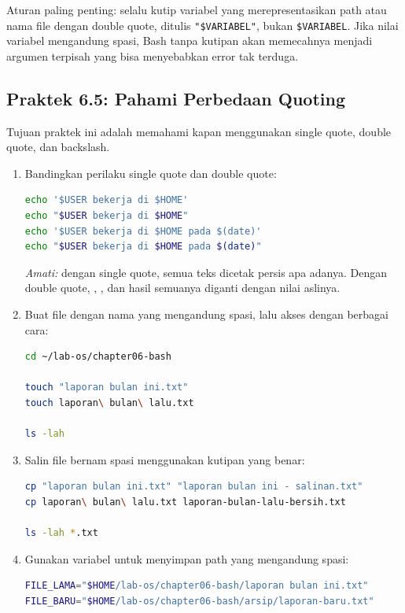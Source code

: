 Aturan paling penting: selalu kutip variabel yang merepresentasikan path
atau nama file dengan double quote, ditulis \texttt{"\$VARIABEL"}, bukan
\texttt{\$VARIABEL}. Jika nilai variabel mengandung spasi, Bash tanpa
kutipan akan memecahnya menjadi argumen terpisah yang bisa menyebabkan
error tak terduga.

\subsection*{Praktek 6.5: Pahami Perbedaan Quoting}

Tujuan praktek ini adalah memahami kapan menggunakan single quote,
double quote, dan backslash.

\begin{enumerate}
    \item Bandingkan perilaku single quote dan double quote:
\begin{lstlisting}[language=bash, caption={Perbedaan single quote dan double quote}]
echo '$USER bekerja di $HOME'
echo "$USER bekerja di $HOME"
echo '$USER bekerja di $HOME pada $(date)'
echo "$USER bekerja di $HOME pada $(date)"
\end{lstlisting}
    \textit{Amati:} dengan single quote, semua teks dicetak persis apa
    adanya. Dengan double quote, , , dan hasil
     semuanya diganti dengan nilai aslinya.

    \item Buat file dengan nama yang mengandung spasi, lalu akses dengan
          berbagai cara:
\begin{lstlisting}[language=bash, caption={Menangani nama file dengan spasi}]
cd ~/lab-os/chapter06-bash

touch "laporan bulan ini.txt"
touch laporan\ bulan\ lalu.txt

ls -lah
\end{lstlisting}

    \item Salin file bernam spasi menggunakan kutipan yang benar:
\begin{lstlisting}[language=bash, caption={Menyalin file dengan nama spasi secara aman}]
cp "laporan bulan ini.txt" "laporan bulan ini - salinan.txt"
cp laporan\ bulan\ lalu.txt laporan-bulan-lalu-bersih.txt

ls -lah *.txt
\end{lstlisting}

    \item Gunakan variabel untuk menyimpan path yang mengandung spasi:
\begin{lstlisting}[language=bash, caption={Variabel untuk path dengan spasi}]
FILE_LAMA="$HOME/lab-os/chapter06-bash/laporan bulan ini.txt"
FILE_BARU="$HOME/lab-os/chapter06-bash/arsip/laporan-baru.txt"


\end{lstlisting}
\end{enumerate}
